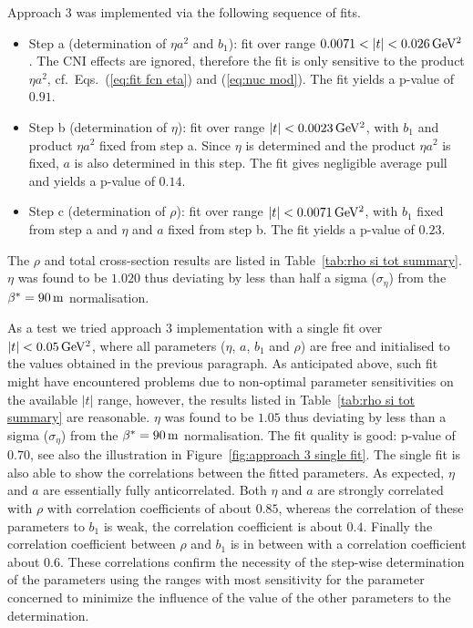 Approach 3 was implemented via the following sequence of fits.
\begin{itemize}[noitemsep,topsep=0pt]
\item Step a (determination of $\eta a^2$ and $b_1$): fit over range $0.0071 < |t| < 0.026\,{\rm GeV^2}$. The CNI effects are ignored, therefore the fit is only sensitive to the product $\eta a^2$, cf.~Eqs.~(\ref{eq:fit fcn eta}) and (\ref{eq:nuc mod}). The fit yields a p-value of $0.91$.
\item Step b (determination of $\eta$): fit over range $|t| < 0.0023\,{\rm GeV^2}$, with $b_1$ and product $\eta a^2$ fixed from step a. Since $\eta$ is determined and the product $\eta a^2$ is fixed, $a$ is also determined in this step. The fit gives negligible average pull and yields a p-value of $0.14$.
\item Step c (determination of $\rho$): fit over range $|t| < 0.0071\,{\rm GeV^2}$, with $b_1$ fixed from step a and $\eta$ and $a$ fixed from step b. The fit yields a p-value of $0.23$.
\end{itemize}
The $\rho$ and total cross-section results are listed in Table~\ref{tab:rho si tot summary}. $\eta$ was found to be $1.020$ thus deviating by less than half a sigma ($\sigma_\eta$) from the $\beta^* = 90\,{\rm m}$ normalisation.

As a test we tried approach 3 implementation with a single fit over $|t| < 0.05\,{\rm GeV^2}$, where all parameters ($\eta$, $a$, $b_1$ and $\rho$) are free and initialised to the values obtained in the previous paragraph. As anticipated above, such fit might have encountered problems due to non-optimal parameter sensitivities on the available $|t|$ range, however, the results listed in Table~\ref{tab:rho si tot summary} are reasonable. $\eta$ was found to be $1.05$ thus deviating by less than a sigma ($\sigma_\eta$) from the $\beta^* = 90\,{\rm m}$ normalisation. The fit quality is good: p-value of $0.70$, see also the illustration in Figure~\ref{fig:approach 3 single fit}. The single fit is also able to show the correlations between the fitted parameters. As expected, $\eta$ and $a$ are essentially fully anticorrelated. Both $\eta$ and $a$ are strongly correlated with $\rho$ with correlation coefficients of about $0.85$, whereas the correlation of these parameters to $b_1$ is weak, the correlation coefficient is about $0.4$. Finally the correlation coefficient between $\rho$ and $b_1$ is in between with a correlation coefficient about 0.6. These correlations confirm the necessity of the step-wise determination of the parameters using the ranges with most sensitivity for the parameter concerned to minimize the influence of the value of the other parameters to the determination.

